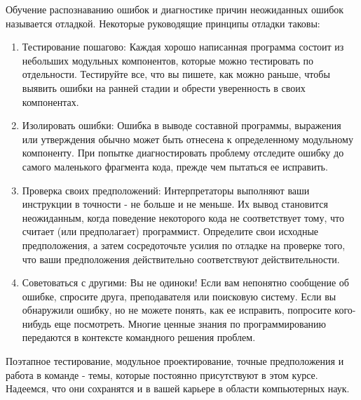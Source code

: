 Обучение распознаванию ошибок и диагностике причин неожиданных ошибок называется отладкой. Некоторые руководящие принципы отладки таковы:
\begin{enumerate}
  \item Тестирование пошагово: Каждая хорошо написанная программа состоит из небольших модульных компонентов, которые можно тестировать по отдельности. Тестируйте все, что вы пишете, как можно раньше, чтобы выявить ошибки на ранней стадии и обрести уверенность в своих компонентах.
  \item Изолировать ошибки: Ошибка в выводе составной программы, выражения или утверждения обычно может быть отнесена к определенному модульному компоненту. При попытке диагностировать проблему отследите ошибку до самого маленького фрагмента кода, прежде чем пытаться ее исправить.
  \item Проверка своих предположений: Интерпретаторы выполняют ваши инструкции в точности - не больше и не меньше. Их вывод становится неожиданным, когда поведение некоторого кода не соответствует тому, что считает (или предполагает) программист. Определите свои исходные предположения, а затем сосредоточьте усилия по отладке на проверке того, что ваши предположения действительно соответствуют действительности.
  \item Советоваться с другими: Вы не одиноки! Если вам непонятно сообщение об ошибке, спросите друга, преподавателя или поисковую систему. Если вы обнаружили ошибку, но не можете понять, как ее исправить, попросите кого-нибудь еще посмотреть. Многие ценные знания по программированию передаются в контексте командного решения проблем.
  \end{enumerate}

Поэтапное тестирование, модульное проектирование, точные предположения и работа в команде - темы, которые постоянно присутствуют в этом курсе. Надеемся, что они сохранятся и в вашей карьере в области компьютерных наук.